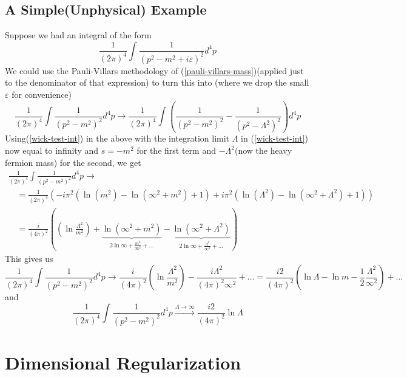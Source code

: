\subsection{A Simple(Unphysical) Example}
Suppose we had an integral of the form
\begin{equation}\frac{1}{(2 \pi)^{4}} \int \frac{1}{\left(p^{2}-m^{2}+i \varepsilon\right)^{2}} d^{4} p\end{equation}
We could use the Pauli-Villars methodology of (\ref{pauli-villars-mass})(applied just to the denominator of that expression) to turn this into (where we drop the small $\varepsilon$ for convenience)
\begin{equation}\frac{1}{(2 \pi)^{4}} \int \frac{1}{\left(p^{2}-m^{2}\right)^{2}} d^{4} p \rightarrow \frac{1}{(2 \pi)^{4}} \int\left(\frac{1}{\left(p^{2}-m^{2}\right)^{2}}-\frac{1}{\left(p^{2}-\Lambda^{2}\right)^{2}}\right) d^{4} p\end{equation}
Using(\ref{wick-test-int}) in the above with the integration limit $\Lambda$ in (\ref{wick-test-int}) now equal to infinity and $s=-m^2$ for the first term and $-\Lambda^2$(now the heavy fermion mass) for the second, we get
$$\begin{array}{l}
\frac{1}{(2 \pi)^{4}} \int \frac{1}{\left(p^{2}-m^{2}\right)^{2}} d^{4} p \rightarrow \\
\quad=\frac{1}{(2 \pi)^{4}}\left(-i \pi^{2}\left(\ln \left(m^{2}\right)-\ln \left(\infty^{2}+m^{2}\right)+1\right)+i \pi^{2}\left(\ln \left(\Lambda^{2}\right)-\ln \left(\infty^{2}+\Lambda^{2}\right)+1\right)\right) \\
\quad=\frac{i}{(4 \pi)^{2}}(\left(\ln \frac{\Lambda^{2}}{m^{2}}\right)+\underbrace{\ln \left(\infty^{2}+m^{2}\right)}_{2\ln\infty+\frac{m^2}{\infty^2}+\dots}-\underbrace{\ln \left(\infty^{2}+\Lambda^{2}\right)}_{2\ln\infty+\frac{\Lambda^2}{\infty^2}+\dots})
\end{array}$$
This gives us
$$\frac{1}{(2 \pi)^{4}} \int \frac{1}{\left(p^{2}-m^{2}\right)^{2}} d^{4} p \rightarrow \frac{i}{(4 \pi)^{2}}\left(\ln \frac{\Lambda^{2}}{m^{2}}\right)-\frac{i\Lambda^2}{(4 \pi)^{2} \infty^{2}}+\ldots=\frac{i 2}{(4 \pi)^{2}}\left(\ln \Lambda-\ln m-\frac{1}{2} \frac{\Lambda^{2}}{\infty^{2}}\right)+\ldots$$
and
$$\frac{1}{(2 \pi)^{4}} \int \frac{1}{\left(p^{2}-m^{2}\right)^{2}} d^{4} p \overset{\Lambda\rightarrow\infty}{\rightarrow} \frac{i 2}{(4 \pi)^{2}} \ln \Lambda$$

\section{Dimensional Regularization}
